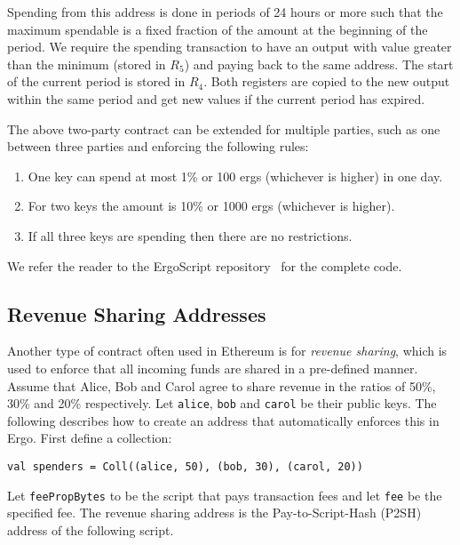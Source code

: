 \documentclass[runningheads]{llncs}
\newcommand{\langname}{ErgoScript\xspace}
\begin{document}
Spending from this address is done in periods of 24 hours or more such that the maximum spendable is a fixed fraction of the amount at the beginning of the period. We require the spending transaction to have an output with value greater than the minimum (stored in $R_5$) and paying back to the same address. The start of the current period is stored in $R_4$. Both registers are copied to the new output within the same period and get new values if the current period has expired. 

The above two-party contract can be extended for multiple parties, such as one between three parties and enforcing the following rules:

\begin{enumerate}
	\item One key can spend at most 1\% or 100 ergs (whichever is higher) in one day.
	\item For two keys the amount is 10\% or 1000 ergs (whichever is higher).
	\item If all three keys are spending then there are no restrictions. 
\end{enumerate}

We refer the reader to the \langname repository~\cite{langrepo} for the complete code.

\subsection{Revenue Sharing Addresses}
\label{revenue-sharing}

Another type of contract often used in Ethereum is for {\em revenue sharing}, which is used to
enforce that all incoming funds are shared in a pre-defined manner.
Assume that Alice, Bob and Carol agree to share revenue in the ratios of 50\%, 30\% and 20\% respectively. Let \texttt{alice}, \texttt{bob} and \texttt{carol} be their public keys. The following describes how to create an address that automatically enforces this in Ergo. First define a collection: 
\begin{verbatim}
val spenders = Coll((alice, 50), (bob, 30), (carol, 20))
\end{verbatim}

Let \texttt{feePropBytes} to be the script that pays transaction fees and let \texttt{fee} be the specified fee. 
The revenue sharing address is the Pay-to-Script-Hash (P2SH) address of the following script.
\end{document}
